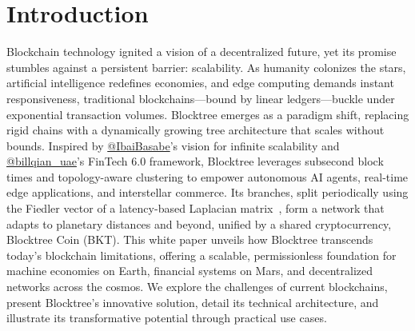 \section{Introduction}
Blockchain technology ignited a vision of a decentralized future, yet its promise stumbles against a persistent barrier: scalability. As humanity colonizes the stars, artificial intelligence redefines economies, and edge computing demands instant responsiveness, traditional blockchains—bound by linear ledgers—buckle under exponential transaction volumes. Blocktree emerges as a paradigm shift, replacing rigid chains with a dynamically growing tree architecture that scales without bounds. Inspired by \href{https://x.com/IbaiBasabe}{@IbaiBasabe}’s vision for infinite scalability and \href{https://x.com/billqian_uae}{@billqian\_uae}’s FinTech 6.0 framework, Blocktree leverages subsecond block times and topology-aware clustering to empower autonomous AI agents, real-time edge applications, and interstellar commerce. Its branches, split periodically using the Fiedler vector of a latency-based Laplacian matrix~\cite{ng2001spectral}, form a network that adapts to planetary distances and beyond, unified by a shared cryptocurrency, Blocktree Coin (BKT). This white paper unveils how Blocktree transcends today’s blockchain limitations, offering a scalable, permissionless foundation for machine economies on Earth, financial systems on Mars, and decentralized networks across the cosmos. We explore the challenges of current blockchains, present Blocktree’s innovative solution, detail its technical architecture, and illustrate its transformative potential through practical use cases.